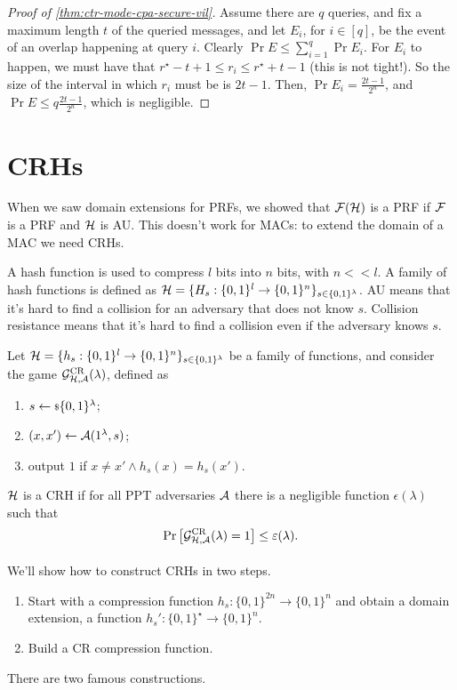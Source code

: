 \begin{proof}[Proof of \cref{thm:ctr-mode-cpa-secure-vil}]
	Assume there are $q$ queries, and fix a maximum length $t$ of the queried messages, and let $E_i$, for $i \in [q]$, be the event of an overlap happening at query $i$.
	Clearly $\Pr{E} \le \sum_{i=1}^{q} \Pr{E_i}$.
	For $E_i$ to happen, we must have that $r^{\star} - t + 1 \le r_i \le r^{\star} + t - 1$ (this is not tight!).
	So the size of the interval in which $r_i$ must be is $2t-1$.
	Then, $\Pr{E_i} = \frac{2t - 1}{2^n}$, and $\Pr{E} \le q \frac{2t - 1}{2^n}$, which is negligible.
\end{proof}

\section{\aclp{CRH}}

When we saw domain extensions for \acp{PRF}, we showed that $\mathcal{F}(\mathcal{H})$ is a \ac{PRF} if $\mathcal{F}$ is a \ac{PRF} and $\mathcal{H}$ is \ac{AU}.
This doesn't work for \acp{MAC}: to extend the domain of a \ac{MAC} we need \acp{CRH}.

A hash function is used to compress $l$ bits into $n$ bits, with $n << l$.
A family of hash functions is defined as $\mathcal{H} = \{ H_s : \{0,1\}^{l} \to \{0,1\}^{n}\}_{s \in \{0,1\}^{\lambda}}$.
\ac{AU} means that it's hard to find a collision for an adversary that does not know $s$.
Collision resistance means that it's hard to find a collision even if the adversary knows $s$.

\begin{definition}
	Let $\mathcal{H} = \{h_s : \{0,1\}^{l} \to \{0,1\}^{n}\}_{s \in \{0,1\}^{\lambda}}$ be a family of functions, and consider the game $\mathcal{G}^{\scriptstyle \text{CR}}_{\mathcal{H},\mathcal{A}}(\lambda)$, defined as
	\begin{enumerate}
		\item $s \leftarrow {\scriptstyle \$} {\{0,1\}^{\lambda}}$;
		\item $(x,x') \leftarrow \mathcal{A} (1^{\lambda}, s)$;
		\item output $1$ if $x \neq x' \land h_s(x) = h_s(x')$.
	\end{enumerate}
	$\mathcal{H}$ is a \ac{CRH} if for all \ac{PPT} adversaries $\mathcal{A}$ there is a negligible function $\epsilon(\lambda)$ such that
	\begin{equation*}
		\mathop{\mathrm{Pr}}\limits_{} \left[ {\mathcal{G}^{\scriptstyle \text{CR}}_{\mathcal{H},\mathcal{A}}(\lambda) = 1} \right] \le \varepsilon(\lambda). \qedhere
	\end{equation*}
\end{definition}

We'll show how to construct \acp{CRH} in two steps.
\begin{enumerate}
	\item Start with a compression function $h_s : \{0,1\}^{2n} \to \{0,1\}^{n}$ and obtain a domain extension, \ie a function $h_s' : \{0,1\}^{\star} \to \{0,1\}^{n}$.
	\item Build a \ac{CR} compression function.
\end{enumerate}
There are two famous constructions.

